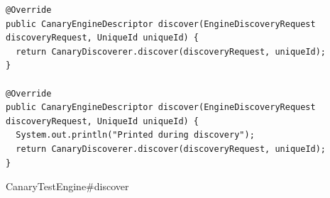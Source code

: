\documentclass[12pt]{article}
\begin{document}
\begin{onehalfspacing}






\begin{listing}[H]
\begin{verbatim}
@Override
public CanaryEngineDescriptor discover(EngineDiscoveryRequest discoveryRequest, UniqueId uniqueId) {
  return CanaryDiscoverer.discover(discoveryRequest, uniqueId);
}

@Override
public CanaryEngineDescriptor discover(EngineDiscoveryRequest discoveryRequest, UniqueId uniqueId) {
  System.out.println("Printed during discovery");
  return CanaryDiscoverer.discover(discoveryRequest, uniqueId);
}
\end{verbatim}
\caption{CanaryTestEngine\#discover}
\label{lst:aa3}
\end{listing}













\end{onehalfspacing}
\end{document}
